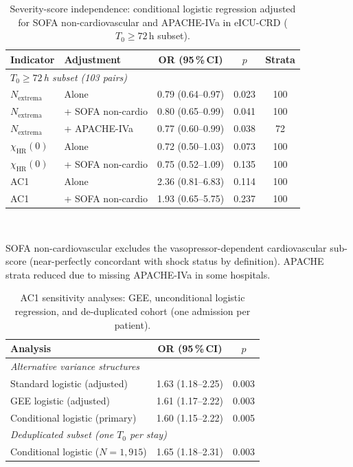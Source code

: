 \documentclass[12pt,a4paper]{article}
\begin{document}
\begin{table}[htbp]
  \centering
  \caption{Severity-score independence: conditional logistic regression
  adjusted for SOFA non-cardiovascular and APACHE-IVa in eICU-CRD
  ($T_0\geq72$\,h subset).}
  \label{tab:sofa}
  \small
  \begin{tabular}{llccc}
    \toprule
    \textbf{Indicator} & \textbf{Adjustment} & \textbf{OR (95\,\%\,CI)} & \textbf{$p$} & \textbf{Strata} \\
    \midrule
    \multicolumn{5}{l}{\textit{$T_0\geq72$\,h subset (103 pairs)}} \\
    $N_{\text{extrema}}$ & Alone              & 0.79 (0.64--0.97) & 0.023 & 100 \\
    $N_{\text{extrema}}$ & + SOFA non-cardio  & 0.80 (0.65--0.99) & 0.041 & 100 \\
    $N_{\text{extrema}}$ & + APACHE-IVa       & 0.77 (0.60--0.99) & 0.038 & 72 \\
    $\chi_{\text{HR}}(0)$ & Alone             & 0.72 (0.50--1.03) & 0.073 & 100 \\
    $\chi_{\text{HR}}(0)$ & + SOFA non-cardio & 0.75 (0.52--1.09) & 0.135 & 100 \\
    AC1 & Alone                               & 2.36 (0.81--6.83) & 0.114 & 100 \\
    AC1 & + SOFA non-cardio                   & 1.93 (0.65--5.75) & 0.237 & 100 \\
    \bottomrule
  \end{tabular}
  \vspace{2pt}\\
  \raggedright\footnotesize
  SOFA non-cardiovascular excludes the vasopressor-dependent cardiovascular
  sub-score (near-perfectly concordant with shock status by definition).
  APACHE strata reduced due to missing APACHE-IVa in some hospitals.
\end{table}

\begin{table}[htbp]
  \centering
  \caption{AC1 sensitivity analyses: GEE, unconditional logistic
  regression, and de-duplicated cohort (one admission per patient).}
  \label{tab:dedup}
  \small
  \begin{tabular}{lcc}
    \toprule
    \textbf{Analysis} & \textbf{OR (95\,\%\,CI)} & \textbf{$p$} \\
    \midrule
    \multicolumn{3}{l}{\textit{Alternative variance structures}} \\
    Standard logistic (adjusted)       & 1.63 (1.18--2.25) & 0.003 \\
    GEE logistic (adjusted)            & 1.61 (1.17--2.22) & 0.003 \\
    Conditional logistic (primary)     & 1.60 (1.15--2.22) & 0.005 \\
    \midrule
    \multicolumn{3}{l}{\textit{Deduplicated subset (one $T_0$ per stay)}} \\
    Conditional logistic ($N=1{,}915$) & 1.65 (1.18--2.31) & 0.003 \\
    \bottomrule
  \end{tabular}
\end{table}
\end{document}

